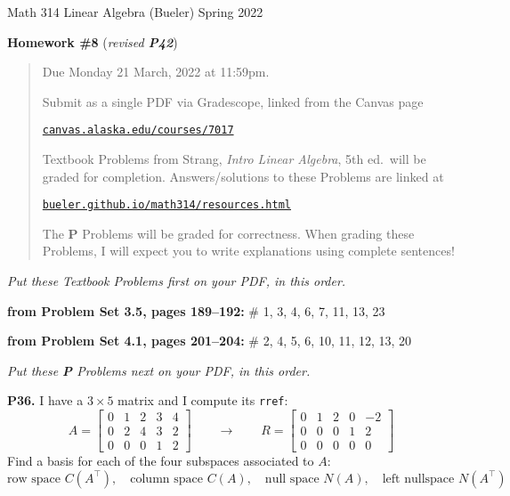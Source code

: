\documentclass[12pt]{amsart}
\newcommand{\prob}[1]{\bigskip\noindent\textbf{#1.}\quad }
\newcommand{\probset}[2]{\bigskip\noindent\textbf{from Problem Set #1, pages #2:}\quad }
\begin{document}
\scriptsize \noindent Math 314 Linear Algebra (Bueler) \hfill Spring 2022
\normalsize\medskip

\Large
\centerline{\textbf{Homework \#8} (\emph{revised \textbf{P42}})}

\normalsize
\bigskip
\begin{quote}
Due Monday 21 March, 2022 at 11:59pm.

\medskip
\noindent Submit as a single PDF via Gradescope, linked from the Canvas page

\href{https://canvas.alaska.edu/courses/7017}{\texttt{canvas.alaska.edu/courses/7017}}

\noindent Textbook Problems from Strang, \emph{Intro Linear Algebra}, 5th ed.~will be graded for completion.  Answers/solutions to these Problems are linked at

\href{https://bueler.github.io/math314/resources.html}{\texttt{bueler.github.io/math314/resources.html}}

\noindent The \textbf{P} Problems will be graded for correctness.  When grading these Problems, I will expect you to write explanations using complete sentences!
\end{quote}
\medskip

\thispagestyle{empty}

\noindent \hrulefill

\noindent \emph{Put these Textbook Problems first on your PDF, in this order.}

\probset{3.5}{189--192} \# 1, 3, 4, 6, 7, 11, 13, 23

\probset{4.1}{201--204} \# 2, 4, 5, 6, 10, 11, 12, 13, 20


\bigskip
\noindent \hrulefill

\noindent \emph{Put these \textbf{P} Problems next on your PDF, in this order.}

\prob{P36}  I have a $3\times 5$ matrix and I compute its \texttt{rref}:
    $$A = \begin{bmatrix} 0 & 1 & 2 & 3 & 4 \\
                          0 & 2 & 4 & 3 & 2 \\
                          0 & 0 & 0 & 1 & 2 \end{bmatrix}
      \qquad \to \qquad
      R = \begin{bmatrix} 0 & 1 & 2 & 0 & -2 \\
                          0 & 0 & 0 & 1 & 2 \\
                          0 & 0 & 0 & 0 & 0 \end{bmatrix}$$
Find a basis for each of the four subspaces associated to $A$:
    $$\text{row space } C(A^\top), \quad \text{column space } C(A), \quad \text{null space } N(A), \quad \text{left nullspace } N(A^\top)$$
\end{document}
